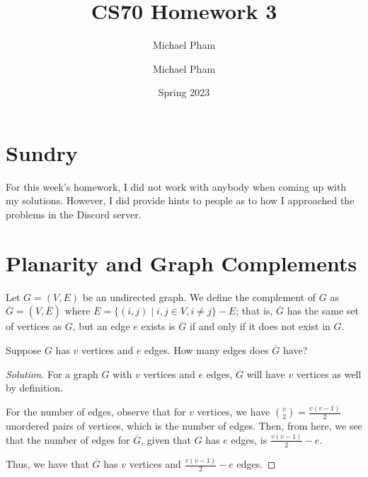 \documentclass{article}
\title{#1}
\author{Michael Pham}
\date{#2}
\newenvironment{solution}{\begin{proof}[Solution]}{\end{proof}}
\newcommand{\mytitle}[2]{%
	\title{#1}
	\author{Michael Pham}
	\date{#2}
	\maketitle
	\newpage
	\tableofcontents
	\newpage
}
\begin{document}
\mytitle{CS70 Homework 3}{Spring 2023}
\setcounter{section}{-1}
\section{Sundry}
For this week's homework, I did not work with anybody when coming up with my solutions. However, I did provide hints to people as to how I approached the problems in the Discord server.

\newpage

\section{Planarity and Graph Complements}
Let $G = (V, E)$ be an undirected graph.  We define the complement of $G$ as $\overline{G} = (V, \overline{E})$ where $\overline{E} = \{(i,j) \mid i,j \in V, i \neq j\} - E$; that is, $\overline{G}$ has the same set of vertices as $G$, but an edge $e$ exists is $\overline{G}$ if and only if it does not exist in $G$.

\begin{hw}
	Suppose $G$ has $v$ vertices and $e$ edges.  How many edges does $\overline{G}$ have?
\end{hw}
\begin{solution}
	For a graph $G$ with $v$ vertices and $e$ edges, $\overline{G}$ will have $v$ vertices as well by definition.
	
	For the number of edges, observe that for $v$ vertices, we have $\binom{v}{2}=\frac{v(v-1)}{2}$ unordered pairs of vertices, which is the number of edges. Then, from here, we see that the number of edges for $\overline{G}$, given that $G$ has $e$ edges, is $\frac{v(v-1)}{2}-e$.
	
	Thus, we have that $\overline{G}$ has $v$ vertices and $\frac{v(v-1)}{2}-e$ edges.
\end{solution}
\end{document}
